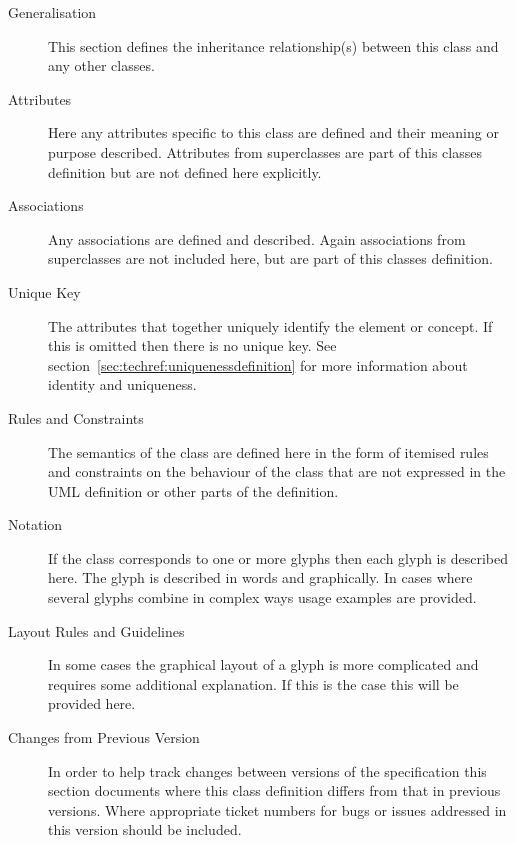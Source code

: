 \begin{description}
\item[Generalisation]  This section defines the inheritance relationship(s) between this
class and any other classes.
\item[Attributes] Here any attributes specific to this class are defined and their
meaning or purpose described. Attributes from superclasses are part of
this classes definition but are not defined here explicitly.
\item[Associations] Any associations are defined and described. Again associations from
superclasses are not included here, but are part of this classes
definition.
\item[Unique Key] The attributes that together uniquely identify the
  \PD element or concept. If this is omitted then there is no unique
  key. See section~\ref{sec:techref:uniquenessdefinition} for more
  information about identity and uniqueness.
\item[Rules and Constraints] The semantics of the class are defined
  here in the form of itemised rules and constraints on the behaviour
  of the class that are not expressed in the UML definition or other
  parts of the definition.
\item[Notation] If the class corresponds to one or more glyphs then each glyph is
described here. The glyph is described in words and graphically. In
cases where several glyphs combine in complex ways usage examples are
provided.
\item[Layout Rules and Guidelines] In some cases the graphical layout of a glyph is more complicated
and requires some additional explanation. If this is the case this
will be provided here.
\item[Changes from Previous Version] In order to help track changes between versions of the specification
this section documents where this class definition differs from
that in previous versions. Where appropriate ticket numbers for bugs
or issues addressed in this version should be included.
\end{description}


